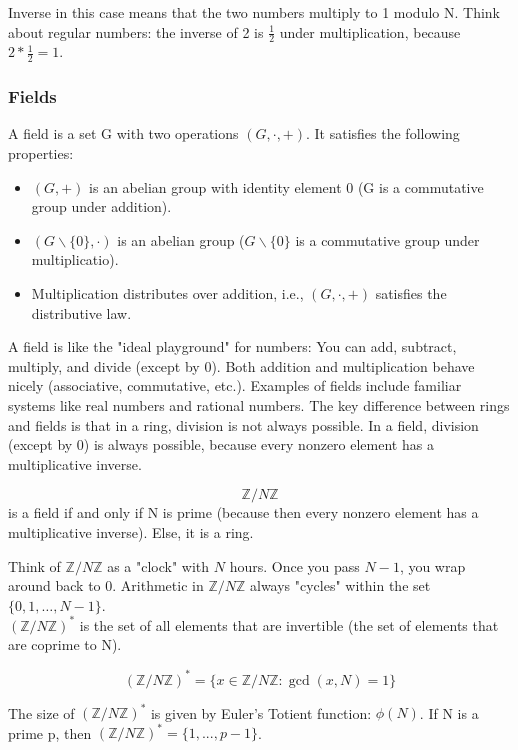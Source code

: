 Inverse in this case means that the two numbers multiply to 1 modulo N. Think about regular numbers: the inverse of 2 is \( \frac{1}{2}\) under multiplication, because \( 2* \frac{1}{2} = 1\). 

\subsubsection{Fields}
\begin{defn}
A field is a set G with two operations \((G, \cdot, +) \). It satisfies the following properties:
\begin{itemize}
    \item \((G, +)\) is an abelian group with identity element 0 (G is a commutative group under addition).
    \item \((G \backslash \{0\}, \cdot)\) is an abelian group (\(G \backslash \{0\}\) is a commutative group under multiplicatio).
    \item Multiplication distributes over addition, i.e., \( (G, \cdot, +) \) satisfies the distributive law.
    \end{itemize}
\end{defn}

A field is like the "ideal playground" for numbers: You can add, subtract, multiply, and divide (except by 0). Both addition and multiplication behave nicely (associative, commutative, etc.). Examples of fields include familiar systems like real numbers and rational numbers.
The key difference between rings and fields is that in a ring, division is not always possible. In a field, division (except by 0) is always possible, because every nonzero element has a multiplicative inverse.

\[ \mathbb{Z}/N\mathbb{Z} \] is a field if and only if N is prime (because then every nonzero element has a multiplicative inverse). Else, it is a ring. 

Think of \(\mathbb{Z}/N\mathbb{Z}\) as a "clock" with \(N\) hours. Once you pass \(N-1\), you wrap around back to \(0\). Arithmetic in \(\mathbb{Z}/N\mathbb{Z}\) always "cycles" within the set \(\{0, 1, \dots, N-1\}\). \\

\( (\mathbb{Z}/N\mathbb{Z})^* \) is the set of all elements that are invertible (the set of elements that are coprime to N). 

\[ (\mathbb{Z}/N\mathbb{Z})^* = \{ x \in \mathbb{Z}/N\mathbb{Z} : \gcd{(x, N)} = 1 \}\] 

The size of \( (\mathbb{Z}/N\mathbb{Z})^* \) is given by Euler's Totient function: \( \phi(N) \). If N is a prime p, then \( (\mathbb{Z}/N\mathbb{Z})^*  = \{1, ..., p-1 \}\).

